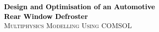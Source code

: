 \begin{titlepage}
    \selectfont 

    \vspace*{3cm}
    
    \centering
    {\Huge \textbf{\textcolor{black}{{Design and Optimisation of an Automotive\\[0.3cm]
    Rear Window Defroster}}}}\\[1.5cm]
    \textsc{\LARGE Multiphysics Modelling Using COMSOL}\\[0.5cm]
    \\[2cm]
    

\end{titlepage}
